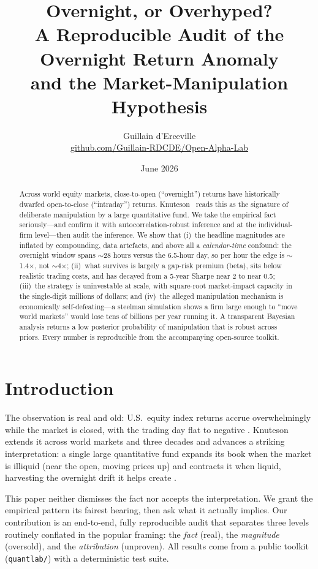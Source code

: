 \documentclass[11pt]{article}
\title{\textbf{Overnight, or Overhyped?}\\[2pt]
\large A Reproducible Audit of the Overnight Return Anomaly\\ and the Market-Manipulation Hypothesis}
\author{Guillain d'Erceville\\
\small\href{https://github.com/Guillain-RDCDE/Open-Alpha-Lab}{github.com/Guillain-RDCDE/Open-Alpha-Lab}}
\date{June 2026}
\begin{document}
\maketitle

\begin{abstract}
\noindent Across world equity markets, close-to-open (``overnight'') returns have
historically dwarfed open-to-close (``intraday'') returns. Knuteson~\cite{knuteson2019,knuteson2023}
reads this as the signature of deliberate manipulation by a large quantitative
fund. We take the empirical fact seriously---and confirm it with
autocorrelation-robust inference and at the individual-firm level---then audit
the inference. We show that (i)~the headline magnitudes are inflated by
compounding, data artefacts, and above all a \emph{calendar-time} confound: the
overnight window spans $\sim$28 hours versus the 6.5-hour day, so per hour the
edge is $\sim$1.4$\times$, not $\sim$4$\times$; (ii)~what survives is largely a
gap-risk premium (beta), sits below realistic trading costs, and has decayed from
a 5-year Sharpe near 2 to near 0.5; (iii)~the strategy is uninvestable at scale,
with square-root market-impact capacity in the single-digit millions of dollars;
and (iv)~the alleged manipulation mechanism is economically self-defeating---a
steelman simulation shows a firm large enough to ``move world markets'' would lose
tens of billions per year running it. A transparent Bayesian analysis returns a
low posterior probability of manipulation that is robust across priors. Every
number is reproducible from the accompanying open-source toolkit.
\end{abstract}

\section{Introduction}
The observation is real and old: U.S.\ equity index returns accrue
overwhelmingly while the market is closed, with the trading day flat to negative
\cite{cooper2008,berkman2012,lou2019}. Knuteson extends it across world markets
and three decades and advances a striking interpretation: a single large
quantitative fund expands its book when the market is illiquid (near the open,
moving prices up) and contracts it when liquid, harvesting the overnight drift it
helps create \cite{knuteson2019,knuteson2023}.

This paper neither dismisses the fact nor accepts the interpretation. We grant
the empirical pattern its fairest hearing, then ask what it actually implies. Our
contribution is an end-to-end, fully reproducible audit that separates three
levels routinely conflated in the popular framing: the \emph{fact} (real), the
\emph{magnitude} (oversold), and the \emph{attribution} (unproven). All results
come from a public toolkit (\texttt{quantlab/}) with a deterministic test suite.
\end{document}
